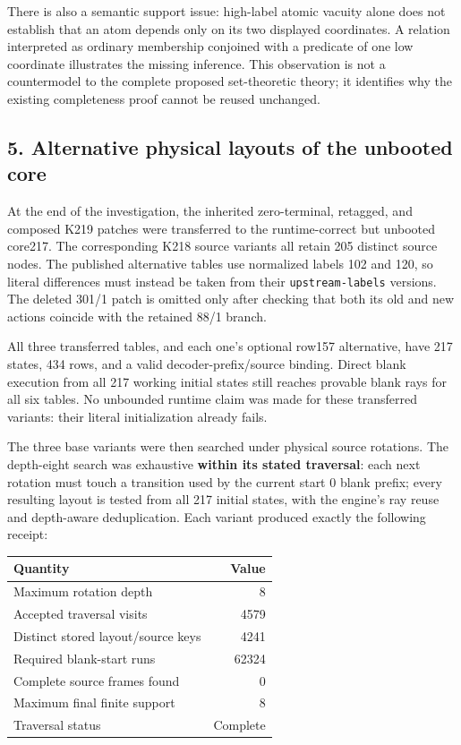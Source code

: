 \documentclass[
  11pt,
]{article}
\begin{document}
There is also a semantic support issue: high-label atomic vacuity alone
does not establish that an atom depends only on its two displayed
coordinates. A relation interpreted as ordinary membership conjoined
with a predicate of one low coordinate illustrates the missing
inference. This observation is not a countermodel to the complete
proposed set-theoretic theory; it identifies why the existing
completeness proof cannot be reused unchanged.

\hypertarget{alternative-physical-layouts-of-the-unbooted-core}{%
\subsection{5. Alternative physical layouts of the unbooted
core}\label{alternative-physical-layouts-of-the-unbooted-core}}

At the end of the investigation, the inherited zero-terminal, retagged,
and composed K219 patches were transferred to the runtime-correct but
unbooted core217. The corresponding K218 source variants all retain 205
distinct source nodes. The published alternative tables use normalized
labels 102 and 120, so literal differences must instead be taken from
their \texttt{upstream-labels} versions. The deleted 301/1 patch is
omitted only after checking that both its old and new actions coincide
with the retained 88/1 branch.

All three transferred tables, and each one's optional row157
alternative, have 217 states, 434 rows, and a valid
decoder-prefix/source binding. Direct blank execution from all 217
working initial states still reaches provable blank rays for all six
tables. No unbounded runtime claim was made for these transferred
variants: their literal initialization already fails.

The three base variants were then searched under physical source
rotations. The depth-eight search was exhaustive \textbf{within its
stated traversal}: each next rotation must touch a transition used by
the current start 0 blank prefix; every resulting layout is tested from
all 217 initial states, with the engine's ray reuse and depth-aware
deduplication. Each variant produced exactly the following receipt:

\begin{longtable}[]{@{}lr@{}}
\toprule\noalign{}
Quantity & Value \\
\midrule\noalign{}
\endhead
\bottomrule\noalign{}
\endlastfoot
Maximum rotation depth & 8 \\
Accepted traversal visits & 4579 \\
Distinct stored layout/source keys & 4241 \\
Required blank-start runs & 62324 \\
Complete source frames found & 0 \\
Maximum final finite support & 8 \\
Traversal status & Complete \\
\end{longtable}
\end{document}

